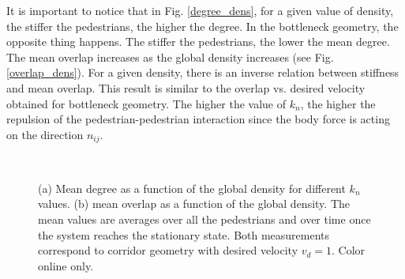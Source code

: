 \documentclass[preprint,12pt]{elsarticle}
\begin{document}
It is important to notice that in Fig. \ref{degree_dens}, for a given value of density, the stiffer the pedestrians, the higher the degree. In the bottleneck geometry, the opposite thing happens. The stiffer the pedestrians, the lower the mean degree.
\\

The mean overlap increases as the global density increases (see Fig. \ref{overlap_dens}). For a given density, there is an inverse relation between stiffness and mean overlap. This result is similar to the overlap vs. desired velocity obtained for bottleneck geometry. The higher the value of $k_n$, the higher the repulsion of the pedestrian-pedestrian interaction since the body force is acting on the direction $n_{ij}$.\\

\begin{figure}[!htbp]
\centering
    \ 
    \\
\caption[width=0.47\columnwidth]{(a) Mean degree as a function of the global density for different $k_n$ values. (b) mean overlap as a function of the global density. The mean values are averages over all the pedestrians and over time once the system reaches the stationary state. Both measurements correspond to corridor geometry with desired velocity $v_d=1$. Color online only.}
\label{network_corridor}
\end{figure}
\end{document}
